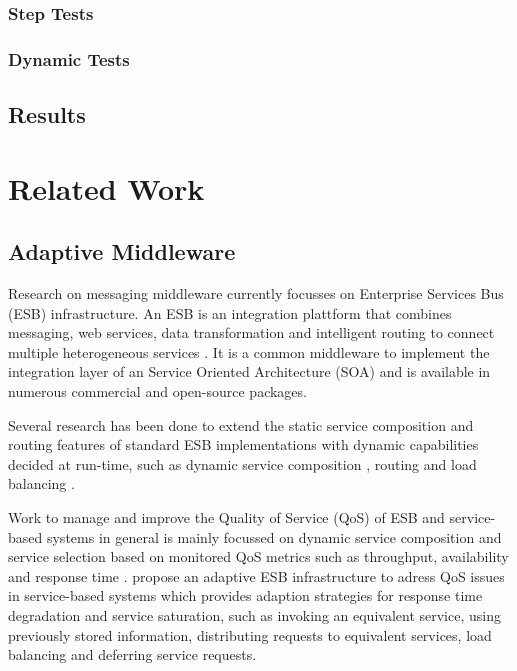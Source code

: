 \subsubsection{Step Tests}

\subsubsection{Dynamic Tests}

\subsection{Results}

\section{Related Work}\label{sec:ch5_related_work}
\subsection{Adaptive Middleware}
Research on messaging middleware currently focusses on Enterprise Services Bus (ESB) infrastructure. An ESB is an integration plattform that combines messaging, web services, data transformation and intelligent routing to connect multiple heterogeneous services \citep{Chappell:2004jo}. It is a common middleware to implement the integration layer of an Service Oriented Architecture (SOA) and is available in numerous commercial and open-source packages.

Several research has been done to extend the static service composition and routing features of standard ESB implementations with dynamic capabilities decided at run-time, such as dynamic service composition \citep{Chang:2007aa}, routing \citep{Bai:2007aa} \citep{Wu:2008aa} \citep{Ziyaeva:2008aa} and load balancing \citep{Jongtaveesataporn:2010aa}.

Work to manage and improve the Quality of Service (QoS) of ESB and service-based systems in general is mainly focussed on dynamic service composition and service selection based on monitored QoS metrics such as throughput, availability and response time \citep{Calinescu:2011aa}. \cite{Gonzalez:2011} propose an adaptive ESB infrastructure to adress QoS issues in service-based systems which provides adaption strategies for response time degradation and service saturation, such as invoking an equivalent service, using previously stored information, distributing requests to equivalent services, load balancing and deferring service requests.

